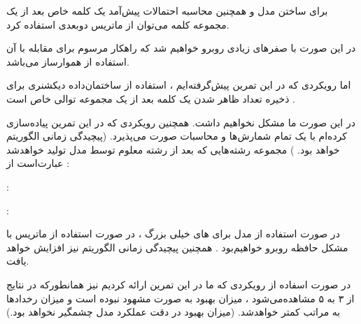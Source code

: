 \begin{boxC}
    برای ساختن مدل 
    و همچنین محاسبه احتمالات پیش‌آمد یک کلمه خاص بعد از یک مجموعه کلمه می‌توان از ماتریس دوبعدی استفاده کرد.

    در این صورت با صفرهای زیادی روبرو خواهیم شد که راهکار مرسوم برای مقابله با آن استفاده از هموارساز
    می‌باشد.
    
    اما رویکردی که در این تمرین پیش‌گرفته‌ایم ، استفاده از ساختمان‌داده دیکشنری برای ذخیره تعداد ظاهر شدن یک کلمه بعد از یک مجموعه توالی خاص است .

    در این صورت ما مشکل
    نخواهیم داشت.
    همچنین رویکردی که در این تمرین پیاده‌سازی کرده‌ام با یک 
    تمام شمارش‌ها و محاسبات صورت می‌پذیرد.
    (پیچیدگی زمانی الگوریتم 
    خواهد بود.
    )
مجموعه رشته‌هایی که بعد از رشته معلوم توسط مدل
تولید خواهدشد عبارت‌است از :
    
     : 
    \newline

     :
    \newline
    \color{black}

    \newline
    \color{black}

\end{boxC}

\begin{boxC}
    در صورت استفاده از مدل
    برای 
      های خیلی بزرگ ، در صورت استفاده از ماتریس با مشکل حافظه روبرو خواهیم‌بود .
      همچنین پیچیدگی زمانی الگوریتم نیز افزایش خواهد یافت.

      در صورت اسفاده از رویکردی که ما در این تمرین ارائه کردیم نیز همانطورکه در نتایج از ۳ به ۵ مشاهده‌می‌شود ، میزان بهبود به صورت مشهود نبوده است و میزان رخداد‌ها به مراتب کمتر خواهدشد.
      (میزان بهبود در دقت عملکرد مدل چشمگیر نخواهد بود.)
\end{boxC}